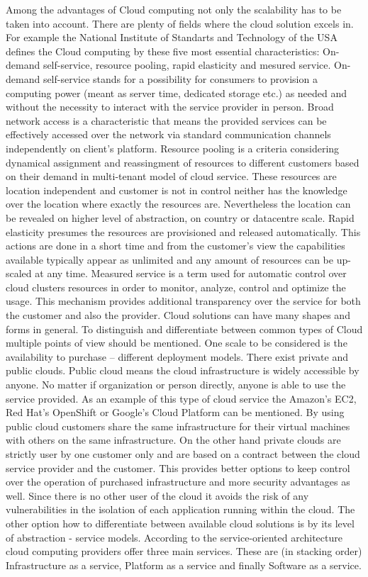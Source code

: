 Among the advantages of Cloud computing not only the scalability has to be taken into account. There are plenty of fields where the cloud solution excels in. For example the National Institute of Standarts and Technology of the USA defines the Cloud computing by these five most essential characteristics: On-demand self-service, resource pooling, rapid elasticity and mesured service.
On-demand self-service stands for a possibility for consumers to provision a computing power (meant as server time, dedicated storage etc.) as needed and without the necessity to interact with the service provider in person.
Broad network access is a characteristic that means the provided services can be effectively accessed over the network via standard communication channels independently on client's platform.
Resource pooling is a criteria considering dynamical assignment and reassingment of resources to different customers based on their demand in multi-tenant model of cloud service. These resources are location independent and customer is not in control neither has the knowledge over the location where exactly the resources are. Nevertheless the location can be revealed on higher level of abstraction, on country or datacentre scale.
Rapid elasticity presumes the resources are provisioned and released automatically. This actions are done in a short time and from the customer's view the capabilities available typically appear as unlimited and any amount of resources can be up-scaled at any time.
Measured service is a term used for automatic control over cloud clusters resources in order to monitor, analyze, control and optimize the usage. This mechanism provides additional transparency over the service for both the customer and also the provider.
Cloud solutions can have many shapes and forms in general. To distinguish and differentiate between common types of Cloud multiple points of view should be mentioned. One scale to be considered is the availability to purchase – different deployment models. There exist private and public clouds. Public cloud means the cloud infrastructure is widely accessible by anyone. No matter if organization or person directly, anyone is able to use the service provided. As an example of this type of cloud service the Amazon's EC2, Red Hat's OpenShift or Google's Cloud Platform can be mentioned. By using public cloud customers share the same infrastructure for their virtual machines with others on the same infrastructure. On the other hand private clouds are strictly user by one customer only and are based on a contract between the cloud service provider and the customer. This provides better options to keep control over the operation of purchased infrastructure and more security advantages as well. Since there is no other user of the cloud it avoids the risk of any vulnerabilities in the isolation of each application running within the cloud.
The other option how to differentiate between available cloud solutions is by its level of abstraction - service models. According to the service-oriented architecture cloud computing providers offer three main services. These are (in stacking order) Infrastructure as a service, Platform as a service and finally Software as a service.

